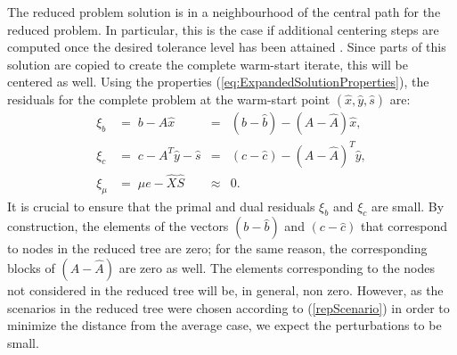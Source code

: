 
The reduced problem solution is in a neighbourhood of the central path 
for the reduced problem. In particular, this is the case if additional 
centering steps are computed once the desired tolerance level has been 
attained \cite{Gondzio98}. 
Since parts of this solution are copied to create the 
complete warm-start iterate, this will be centered as well.
Using the properties (\ref{eq:ExpandedSolutionProperties}),
the residuals for the complete problem at the warm-start point 
$(\hat{x}, \hat{y}, \hat{s})$ are:
\[
\begin{array}{lllll}
 \xi_b \!\!\! &=\; b-A\hat{x} \!\!&=&\!\! (b-\hat{b})-(A-\hat{A})\hat{x},\\
 \xi_c \!\!\! &=\; c -A^T\hat{y}-\hat{s}\!\! &=&\!\! (c-\hat{c})-(A-\hat{A})^T\hat{y},\\ 
 \xi_\mu\!\!\!&=\; \mu e - \hat{X}\hat{S}  & \approx & 0.
\end{array}
\]
%
It is crucial to ensure that the primal and dual residuals 
$\xi_b$ and $\xi_c$ are small. 
By construction, the elements of the vectors 
$(b-\hat{b})$ and $(c-\hat{c})$ that correspond to nodes in the reduced 
tree are zero; for the same reason, the corresponding blocks of 
$(A-\hat{A})$ are zero as well.
%
The elements corresponding to the nodes not considered in the reduced 
tree will be, in general, non zero. However, as the scenarios 
in the reduced tree were chosen according to (\ref{repScenario}) 
in order to minimize the distance 
from the average case, we expect the perturbations to be small. 

